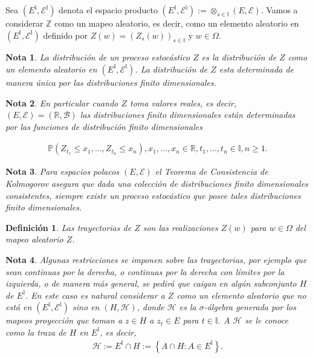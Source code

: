 \documentclass{article}
\newtheorem{Def}{Definición}
\newtheorem{Note}{Nota}
\newcommand{\prob}{\mathbb{P}}
\begin{document}
Sea $\left(E^{\mathbb{I}},\mathcal{E}^{\mathbb{I}}\right)$ denota el espacio producto $\left(E^{\mathbb{I}},\mathcal{E}^{\mathbb{I}}\right):=\otimes_{s\in\mathbb{I}}\left(E,\mathcal{E}\right)$. Vamos a considerar $\mathbb{Z}$ como un mapeo aleatorio, es decir, como un elemento aleatorio en $\left(E^{\mathbb{I}},\mathcal{E}^{\mathbb{I}}\right)$ definido por $Z\left(w\right)=\left(Z_{s}\left(w\right)\right)_{s\in\mathbb{I}}$ y $w\in\Omega$.

\begin{Note}
La distribuci\'on de un proceso estoc\'astico $Z$ es la distribuci\'on de $Z$ como un elemento aleatorio en $\left(E^{\mathbb{I}},\mathcal{E}^{\mathbb{I}}\right)$. La distribuci\'on de $Z$ esta determinada de manera \'unica por las distribuciones finito dimensionales.
\end{Note}

\begin{Note}
En particular cuando $Z$ toma valores reales, es decir, $\left(E,\mathcal{E}\right)=\left(\mathbb{R},\mathcal{B}\right)$ las distribuciones finito dimensionales est\'an determinadas por las funciones de distribuci\'on finito dimensionales

\begin{eqnarray}
\prob\left(Z_{t_{1}}\leq x_{1},\ldots,Z_{t_{n}}\leq x_{n}\right),x_{1},\ldots,x_{n}\in\mathbb{R},t_{1},\ldots,t_{n}\in\mathbb{I},n\geq1.
\end{eqnarray}
\end{Note}

\begin{Note}
Para espacios polacos $\left(E,\mathcal{E}\right)$ el Teorema de Consistencia de Kolmogorov asegura que dada una colecci\'on de distribuciones finito dimensionales consistentes, siempre existe un proceso estoc\'astico que posee tales distribuciones finito dimensionales.
\end{Note}


\begin{Def}
Las trayectorias de $Z$ son las realizaciones $Z\left(w\right)$ para $w\in\Omega$ del mapeo aleatorio $Z$.
\end{Def}

\begin{Note}
Algunas restricciones se imponen sobre las trayectorias, por ejemplo que sean continuas por la derecha, o continuas por la derecha con l\'imites por la izquierda, o de manera m\'as general, se pedir\'a que caigan en alg\'un subconjunto $H$ de $E^{\mathbb{I}}$. En este caso es natural considerar a $Z$ como un elemento aleatorio que no est\'a en $\left(E^{\mathbb{I}},\mathcal{E}^{\mathbb{I}}\right)$ sino en $\left(H,\mathcal{H}\right)$, donde $\mathcal{H}$ es la $\sigma$-\'algebra generada por los mapeos proyecci\'on que toman a $z\in H$ a $z_{t}\in E$ para $t\in\mathbb{I}$. A $\mathcal{H}$ se le conoce como la traza de $H$ en $E^{\mathbb{I}}$, es decir,
\begin{eqnarray}
\mathcal{H}:=E^{\mathbb{I}}\cap H:=\left\{A\cap H:A\in E^{\mathbb{I}}\right\}.
\end{eqnarray}
\end{Note}
\end{document}
